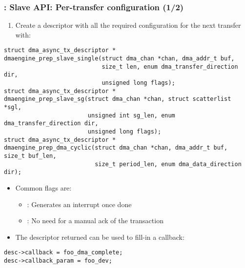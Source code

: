 \begin{frame}[fragile]
  \frametitle{: Slave API: Per-transfer configuration (1/2)}
  \begin{enumerate}
  \item Create a descriptor with all the required configuration for the
    next transfer with:
  \end{enumerate}
\begin{verbatim}
struct dma_async_tx_descriptor *
dmaengine_prep_slave_single(struct dma_chan *chan, dma_addr_t buf,
                            size_t len, enum dma_transfer_direction dir,
                            unsigned long flags);
struct dma_async_tx_descriptor *
dmaengine_prep_slave_sg(struct dma_chan *chan, struct scatterlist *sgl,
                        unsigned int sg_len, enum dma_transfer_direction dir,
                        unsigned long flags);
struct dma_async_tx_descriptor *
dmaengine_prep_dma_cyclic(struct dma_chan *chan, dma_addr_t buf, size_t buf_len,
                          size_t period_len, enum dma_data_direction dir);
\end{verbatim}
  \begin{itemize}
  \item Common flags are:
    \begin{itemize}
    \item {}: Generates an interrupt once done
    \item {}: No need for a manual ack of the
      transaction
    \end{itemize}
  \item The descriptor returned can be used to fill-in a callback:
  \end{itemize}
\begin{verbatim}
desc->callback = foo_dma_complete;
desc->callback_param = foo_dev;
\end{verbatim}
\end{frame}

